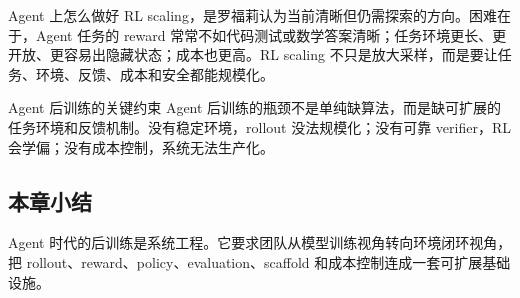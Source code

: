 Agent 上怎么做好 RL scaling，是罗福莉认为当前清晰但仍需探索的方向。困难在于，Agent 任务的 reward 常常不如代码测试或数学答案清晰；任务环境更长、更开放、更容易出隐藏状态；成本也更高。RL scaling 不只是放大采样，而是要让任务、环境、反馈、成本和安全都能规模化。

\begin{importantbox}{Agent 后训练的关键约束}
Agent 后训练的瓶颈不是单纯缺算法，而是缺可扩展的任务环境和反馈机制。没有稳定环境，rollout 没法规模化；没有可靠 verifier，RL 会学偏；没有成本控制，系统无法生产化。
\end{importantbox}

\subsection{本章小结}

Agent 时代的后训练是系统工程。它要求团队从模型训练视角转向环境闭环视角，把 rollout、reward、policy、evaluation、scaffold 和成本控制连成一套可扩展基础设施。


